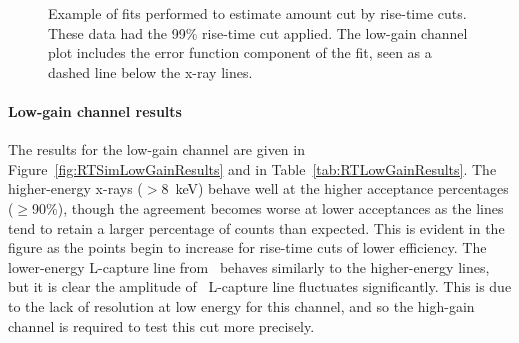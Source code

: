 					\begin{figure}
						\centering
						\def\plotwidth{0.75\textwidth}
						
						\caption[Example of fits performed to estimate amount cut by rise-time cuts]
						{Example of fits performed to estimate amount cut by rise-time cuts.  These data had the 99\% rise-time cut applied.  The low-gain channel 
						plot includes the error function component of the fit, seen as a dashed line below the x-ray lines.}
						\label{fig:BeGeFitExample}
					\end{figure}


					\paragraph{Low-gain channel results}

The results for the low-gain channel are given in Figure~\ref{fig:RTSimLowGainResults} and in Table~\ref{tab:RTLowGainResults}.  The higher-energy x-rays ($>8$~keV) behave well at the higher acceptance percentages ($\ge$90\%), though the agreement becomes worse at lower acceptances as the lines tend to retain a larger percentage of counts than expected.  This is evident in the figure as the points begin to increase for rise-time cuts of lower efficiency.  The lower-energy L-capture line from \gersixeight~behaves similarly to the higher-energy lines, but it is clear the amplitude of \znsixfive~L-capture line fluctuates significantly.  This is due to the lack of resolution at low energy for this channel, and so the high-gain channel is required to test this cut more precisely.  

